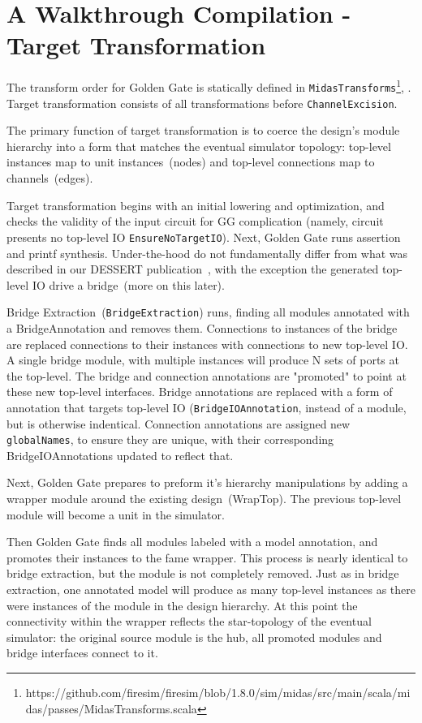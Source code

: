 \section{A Walkthrough Compilation - Target Transformation}
The transform order for Golden Gate is statically defined in
\texttt{MidasTransforms}\footnote{https://github.com/firesim/firesim/blob/1.8.0/sim/midas/src/main/scala/midas/passes/MidasTransforms.scala},
. Target transformation consists of all transformations before
\texttt{ChannelExcision}.

The primary function of target transformation is to coerce the design's module
hierarchy into a form that matches the eventual simulator topology: top-level
instances map to unit instances~(nodes) and top-level connections map to
channels~(edges).

Target transformation begins with an initial lowering and optimization, and
checks the validity of the input circuit for GG complication (namely, circuit
presents no top-level IO \texttt{EnsureNoTargetIO}). Next, Golden Gate
runs assertion and printf synthesis. Under-the-hood do not fundamentally differ
from what was described in our DESSERT publication~\cite{DESSERT}, with the
exception the generated top-level IO drive a bridge~(more on this later).

Bridge Extraction~(\texttt{BridgeExtraction}) runs, finding all modules
annotated with a BridgeAnnotation and removes them. Connections to instances of
the bridge are replaced connections to their instances with connections to new
top-level IO. A single bridge module, with multiple instances will produce N
sets of ports at the top-level. The bridge and connection annotations are
"promoted" to point at these new top-level interfaces. Bridge annotations are
replaced with a form of annotation that targets top-level IO
(\texttt{BridgeIOAnnotation}, instead of a module, but is otherwise indentical.
Connection annotations are assigned new \texttt{globalNames}, to ensure they
are unique, with their corresponding BridgeIOAnnotations updated to reflect
that.

Next, Golden Gate prepares to preform it's hierarchy manipulations by adding a
wrapper module around the existing design~(WrapTop). The previous
top-level module will become a unit in the simulator.

Then Golden Gate finds all modules labeled with a model annotation, and
promotes their instances to the fame wrapper. This process is nearly identical
to bridge extraction, but the module is not completely removed. Just as in
bridge extraction, one annotated model will produce as many top-level instances
as there were instances of the module in the design hierarchy.  At this point
the connectivity within the wrapper reflects the star-topology of the eventual
simulator: the original source module is the hub, all promoted modules and
bridge interfaces connect to it.


